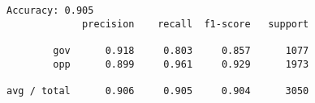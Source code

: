 \documentclass[11pt]{article}
\begin{document}
    \begin{Verbatim}[commandchars=\\\{\}]
Accuracy: 0.905
             precision    recall  f1-score   support

        gov      0.918     0.803     0.857      1077
        opp      0.899     0.961     0.929      1973

avg / total      0.906     0.905     0.904      3050


    \end{Verbatim}


    
    
    
    
\end{document}
